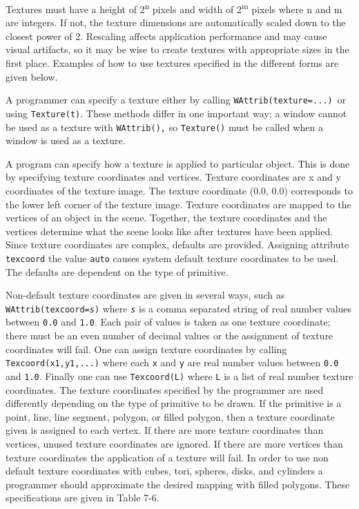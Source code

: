 Textures must have a height of 2\textsuperscript{n} pixels and width
of 2\textsuperscript{m} pixels where n and m are integers. If not, the
texture dimensions are automatically scaled down to the closest power
of 2. Rescaling affects application performance and may cause visual
artifacts, so it may be wise to create textures with appropriate sizes
in the first place. Examples of how to use textures specified in the
different forms are given below.

A programmer can specify a texture either by calling
\texttt{WAttrib({\textquotedbl}texture=...{\textquotedbl})}\texttt{ }or
using \texttt{Texture(t)}. These methods differ in one important way: a
window cannot be used as a texture with \texttt{WAttrib(),} so
\texttt{Texture()} must be called when a window is used as a texture.

A program can specify how a texture is applied to particular object.
This is done by specifying texture coordinates and vertices. Texture
coordinates are x and y coordinates of the texture image. The texture
coordinate (0.0, 0.0) corresponds to the lower left corner of the
texture image. Texture coordinates are mapped to the vertices of an
object in the scene. Together, the texture coordinates and the vertices
determine what the scene looks like after textures have been applied.
Since texture coordinates are complex, defaults are provided. Assigning
attribute \texttt{texcoord} the value \texttt{auto} causes system
default texture coordinates to be used. The defaults are dependent on
the type of primitive.

Non-default texture coordinates are given in several ways, such as \linebreak
\texttt{WAttrib({\textquotedbl}texcoord=}\texttt{\textit{s{\textquotedbl}}}\texttt{)}
where \texttt{\textit{s}} is a comma separated string of real number
values between \texttt{0.0} and \texttt{1.0}. Each pair of values is
taken as one texture coordinate; there must be an even number of
decimal values or the assignment of texture coordinates will fail. One
can assign texture coordinates by calling \texttt{Texcoord(x1,y1,...)}
where each \texttt{x} and \texttt{y} are real number values between
\texttt{0.0} and \texttt{1.0}. Finally one can use \texttt{Texcoord(L)}
where \texttt{L} is a list of real number texture coordinates. The
texture coordinates specified by the programmer are used differently
depending on the type of primitive to be drawn. If the primitive is a
point, line, line segment, polygon, or filled polygon, then a texture
coordinate given is assigned to each vertex. If there are more texture
coordinates than vertices, unused texture coordinates are ignored. If
there are more vertices than texture coordinates the application of a
texture will fail. In order to use non default texture coordinates
with cubes, tori, spheres, disks, and cylinders a programmer should
approximate the desired mapping with filled polygons. These
specifications are given in Table 7-6.

